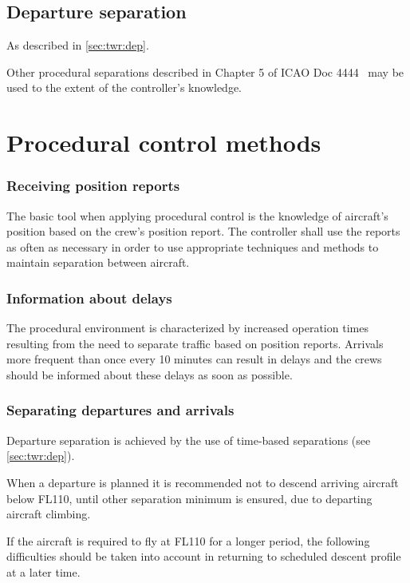 \subsection{Departure separation}
As described in \cref{sec:twr:dep}.

Other procedural separations described in Chapter 5 of ICAO Doc 4444~\cite{4444}
may be used to the extent of the controller's knowledge.

\section{Procedural control methods}%
\label{sec:app:procedural_methods}

\subsubsection{Receiving position reports}

The basic tool when applying procedural control is the knowledge of aircraft's
position based on the crew's position report. The controller shall use the
reports as often as necessary in order to use appropriate techniques and methods
to maintain separation between aircraft.

\subsubsection{Information about delays}

The procedural environment is characterized by increased operation times
resulting from the need to separate traffic based on position reports. Arrivals
more frequent than once every 10 minutes can result in delays and the crews
should be informed about these delays as soon as possible.

\subsubsection{Separating departures and arrivals}

Departure separation is achieved by the use of time-based separations (see
\cref{sec:twr:dep}).

When a departure is planned it is recommended not to descend arriving aircraft
below FL110, until other separation minimum is ensured, due to departing
aircraft climbing.

If the aircraft is required to fly at FL110 for a longer period, the following
difficulties should be taken into account in returning to scheduled descent
profile at a later time.

